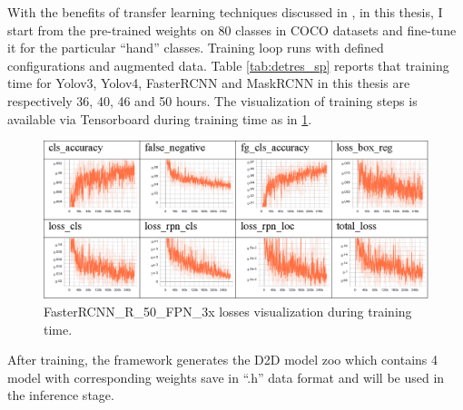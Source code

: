 With the benefits of transfer learning techniques discussed in \cite{DBLP:journals/corr/abs-1808-01974}, in this thesis, I start from the pre-trained weights on 80 classes in COCO datasets and fine-tune it for the particular “hand” classes. Training loop runs with defined configurations and augmented data. Table \ref{tab:detres_sp} reports that training time for Yolov3, Yolov4, FasterRCNN and MaskRCNN in this thesis are respectively 36, 40, 46 and 50 hours.
The visualization of training steps is available via Tensorboard during training time as in \ref{fig:tensorboard}.
\begin{figure}
	\centerline{\includegraphics[width=1\linewidth]{Figs/tensorboard.png}}
	\caption{FasterRCNN\_R\_50\_FPN\_3x losses visualization during training time.}
	\label{fig:tensorboard}
\end{figure}
After training, the framework generates the D2D model zoo which contains 4 model with corresponding weights save in “.h” data format and will be used in the inference stage.
